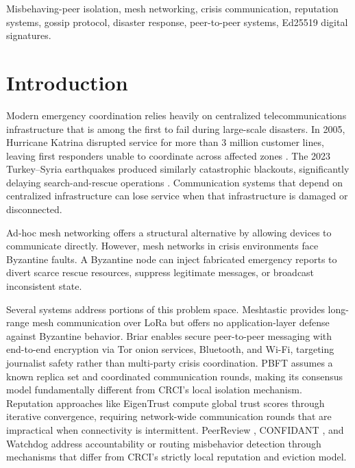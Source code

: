 \documentclass[conference]{IEEEtran}
\begin{document}
\begin{IEEEkeywords}
Misbehaving-peer isolation, mesh networking, crisis communication, reputation systems, gossip protocol, disaster response, peer-to-peer systems, Ed25519 digital signatures.
\end{IEEEkeywords}

\section{Introduction}
Modern emergency coordination relies heavily on centralized telecommunications infrastructure that is among the first to fail during large-scale disasters. In 2005, Hurricane Katrina disrupted service for more than 3 million customer lines, leaving first responders unable to coordinate across affected zones \cite{fcc2006katrina}. The 2023 Turkey--Syria earthquakes produced similarly catastrophic blackouts, significantly delaying search-and-rescue operations \cite{unocha2023turkey}. Communication systems that depend on centralized infrastructure can lose service when that infrastructure is damaged or disconnected.

Ad-hoc mesh networking offers a structural alternative by allowing devices to communicate directly. However, mesh networks in crisis environments face Byzantine faults. A Byzantine node can inject fabricated emergency reports to divert scarce rescue resources, suppress legitimate messages, or broadcast inconsistent state.

Several systems address portions of this problem space. Meshtastic \cite{meshtastic} provides long-range mesh communication over LoRa but offers no application-layer defense against Byzantine behavior. Briar \cite{briar} enables secure peer-to-peer messaging with end-to-end encryption via Tor onion services, Bluetooth, and Wi-Fi, targeting journalist safety rather than multi-party crisis coordination. PBFT \cite{castro1999pbft} assumes a known replica set and coordinated communication rounds, making its consensus model fundamentally different from CRCI's local isolation mechanism. Reputation approaches like EigenTrust \cite{kamvar2003eigentrust} compute global trust scores through iterative convergence, requiring network-wide communication rounds that are impractical when connectivity is intermittent. PeerReview \cite{haeberlen2007peerreview}, CONFIDANT \cite{buchegger2002confidant}, and Watchdog \cite{marti2000watchdog} address accountability or routing misbehavior detection through mechanisms that differ from CRCI's strictly local reputation and eviction model.
\end{document}
